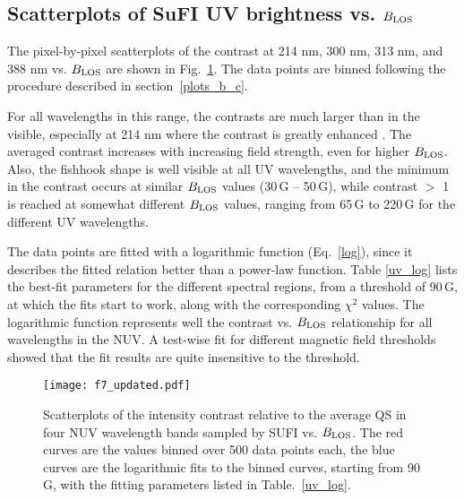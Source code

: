 \documentclass[goettingen, gauss, print]{thesis}
\begin{document}
\subsection{Scatterplots of SuFI UV brightness vs. $B_{\rm LOS}$}
\label{uv_vs_B}
The pixel-by-pixel scatterplots of the contrast at 214 nm, 300 nm, 313 nm, and 388 nm vs. $B_{\rm LOS}$ are shown in Fig.~\ref{chap_3_sufi_UV}. The data points are binned following the procedure described in section~\ref{plots_b_c}.

For all wavelengths in this range, the contrasts are much larger than in the visible, especially at 214 nm where the contrast is greatly enhanced \citep[see][]{riethmuller_bright_2010}. The averaged contrast increases with increasing field strength, even for higher $B_{\rm LOS}$. Also, the fishhook shape is well visible at all UV wavelengths, and the minimum in the contrast occurs at similar $B_{\rm LOS}$ values (30\,G -- 50\,G), while contrast $>$ 1 is reached at somewhat different $B_{\rm LOS}$ values, ranging from 65\,G to 220\,G for the different UV wavelengths. 

The data points are fitted with a logarithmic function (Eq.~\ref{log}), since it describes the fitted relation better than a power-law function. Table \ref{uv_log} lists the best-fit parameters for the different spectral regions, from a threshold of 90\,G, at which the fits start to work, along with the corresponding $\chi^2$ values. 
The logarithmic function represents well the contrast vs. $B_{\rm LOS}$ relationship for all wavelengths in the NUV. A test-wise fit for different magnetic field thresholds showed that the fit results are quite insensitive to the threshold. 


\begin{figure*}
\centering
\texttt{[image: f7\_updated.pdf]}
\caption{Scatterplots of the intensity contrast relative to the average QS in four NUV wavelength bands sampled by SUFI vs. $B_{\rm LOS}$. The red curves are the values binned over 500 data points each, the blue curves are the logarithmic fits to the binned curves, starting from 90\,G,  with the fitting parameters listed in Table.~\ref{uv_log}.}
\label{chap_3_sufi_UV}
\end{figure*}
\end{document}
